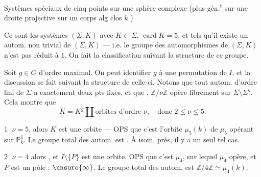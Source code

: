 Systèmes spéciaux de cinq points sur une sphère complexe (plus gén.\textsuperscript{t} sur une  droite projective sur un corps alg clos \(k\) )

Ce sont les systèmes \((\Sigma,K)\) avec \(K\subset\Sigma\), \(\operatorname{card}K=5\), et tels qu’il existe un autom. non trivial de \((\Sigma,K)\) --- i.e. le groupe  des automorphismes de \((\Sigma,K)\) n’est pas réduit à \(1\). On fait la classification suivant la structure de ce groupe.

Soit \(g\in G\) d’ordre maximal. On peut identifier \(g\) à une permutation de \(I\), et la discussion se fait suivant la structure de celle-ci. Notons que  tout autom. d’ordre fini de \(\Sigma\)  a exactement deux pts fixes, et que  , \(\mathbb Z/\nu\mathbb Z\) opère librement sur \(\Sigma\setminus\Sigma^g\). Cela montre que
\[
K=K^g\amalg\text{orbites d’ordre }\nu,\quad\text{donc }2\leq\nu\leq5.
\]

\textcircled{1} \(\nu=5\), alors \(K\) est une orbite --- OPS que c’est l’orbite \(\mu_5(k)\) de \(\mu_5\) opérant sur \(\mathbb P^1_k\). Le groupe total des autom. est . À isom. près, il y a un seul tel cas.


\textcircled{2} \(\nu=4\) alors  , et \(I\setminus\{P\}\) est une orbite. OPS que c’est \(\mu_4\), sur lequel \(\mu_4\) opère, et \(P\) est un pôle : \(\unsure{\infty}\). Le groupe total des autom. est \(\mathbb Z/4\mathbb Z\simeq\mu_4(k)\).

